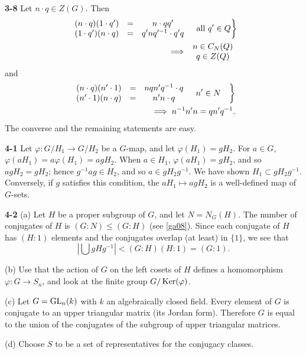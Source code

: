 \documentclass[a4paper,11pt,final]{memoir}%
\theoremstyle{nonumberplain}
\begin{document}
\bigskip\noindent\textbf{3-8}
Let $n\cdot q\in Z(G)$. Then%
\begin{align*}
\left.
\begin{array}
[c]{ccc}%
(n\cdot q)(1\cdot q^{\prime}) & = & n\cdot qq^{\prime}\\
(1\cdot q^{\prime})(n\cdot q) & = & q^{\prime}nq^{\prime-1}\cdot q^{\prime}q
\end{array}
\quad\text{all }q^{\prime}\in Q\right\} \\
 \implies%
\begin{array}
[c]{c}%
n\in C_{N}(Q)\\
q\in Z(Q)
\end{array}
\end{align*}
and%
\begin{align*}
\left.
\begin{array}
[c]{ccc}%
(n\cdot q)(n^{\prime}\cdot1) & = & nqn^{\prime}q^{-1}\cdot q\\
(n^{\prime}\cdot1)(n\cdot q) & = & n^{\prime}n\cdot q
\end{array}
\quad n^{\prime}\in N\quad\right\} \\
 \implies n^{-1}n^{\prime}n=qn^{\prime
}q^{-1}.
\end{align*}
The converse and the remaining statements are easy.

\bigskip\noindent\textbf{4-1}
Let $\varphi\colon G/H_{1}\rightarrow G/H_{2}$ be a $G$-map, and let
$\varphi(H_{1})=gH_{2}$. For $a\in G$, $\varphi(aH_{1})=a\varphi
(H_{1})=agH_{2}$. When $a\in H_{1}$, $\varphi(aH_{1})=gH_{2}$, and so
$agH_{2}=gH_{2}$; hence $g^{-1}ag\in H_{2}$, and so $a\in gH_{2}g^{-1}$. We
have shown $H_{1}\subset gH_{2}g^{-1}$. Conversely, if $g$ satisfies this
condition, the $aH_{1}\mapsto agH_{2}$ is a well-defined map of $G$-sets.

\bigskip\noindent\textbf{4-2}
(a) Let $H$ be a proper subgroup of $G$, and let $N=N_{G}(H)$. The number of
conjugates of $H$ is $(G:N)\leq(G:H)$ (see \ref{ga08}). Since each conjugate
of $H$ has $(H:1)$ elements and the conjugates overlap (at least) in $\{1\}$,
we see that
\[
\left\vert \bigcup gHg^{-1}\right\vert <(G:H)(H:1)=(G:1).
\]\par
(b) Use that the action of  $G$ on the left cosets of $H$ defines a homomorphism $\varphi\colon G\to S_n$, and
look at the finite group $G/\operatorname{Ker}(\varphi)$.\par
(c)  Let $G=\operatorname{GL}_n(k)$
with $k$ an algebraically closed field. Every element of $G$
is conjugate to an upper triangular matrix (its Jordan form). Therefore
$G$ is equal to the union of the conjugates of the subgroup of upper triangular matrices.\par
(d) Choose $S$ to be a set of representatives for the
conjugacy classes.
\end{document}
